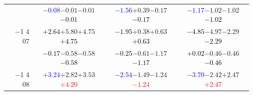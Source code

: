 \documentclass[compress]{beamer}
\begin{document}
\begin{frame}
\begin{tabular}{r | c | c | c}
          & \textcolor{blue}{$-0.08$}\hspace{0.1 cm}$-0.01$\hspace{0.1 cm}$-0.01$\hspace{0.1 cm}\textcolor{black}{$-0.01$} & \textcolor{blue}{$-1.56$}\hspace{0.1 cm}$+0.39$\hspace{0.1 cm}$-0.17$\hspace{0.1 cm}\textcolor{black}{$-0.17$} & \textcolor{blue}{$-1.17$}\hspace{0.1 cm}$-1.02$\hspace{0.1 cm}$-1.02$\hspace{0.1 cm}\textcolor{black}{$-1.02$} \\
$-$1 4 07 & \textcolor{black}{$+2.64$}\hspace{0.1 cm}$+5.80$\hspace{0.1 cm}$+4.75$\hspace{0.1 cm}\textcolor{black}{$+4.75$} & \textcolor{black}{$-1.95$}\hspace{0.1 cm}$+0.38$\hspace{0.1 cm}$+0.63$\hspace{0.1 cm}\textcolor{black}{$+0.63$} & \textcolor{black}{$-4.85$}\hspace{0.1 cm}$-4.97$\hspace{0.1 cm}$-2.29$\hspace{0.1 cm}\textcolor{black}{$-2.29$} \\
          & \textcolor{black}{$-0.17$}\hspace{0.1 cm}$-0.58$\hspace{0.1 cm}$-0.58$\hspace{0.1 cm}\textcolor{black}{$-0.58$} & \textcolor{black}{$-0.25$}\hspace{0.1 cm}$-0.61$\hspace{0.1 cm}$-1.17$\hspace{0.1 cm}\textcolor{black}{$-1.17$} & \textcolor{black}{$+0.02$}\hspace{0.1 cm}$-0.46$\hspace{0.1 cm}$-0.46$\hspace{0.1 cm}\textcolor{black}{$-0.46$} \\
$-$1 4 08 & \textcolor{blue}{$+3.24$}\hspace{0.1 cm}$+2.82$\hspace{0.1 cm}$+3.53$\hspace{0.1 cm}\textcolor{red}{$+4.20$} & \textcolor{blue}{$-2.54$}\hspace{0.1 cm}$-1.49$\hspace{0.1 cm}$-1.24$\hspace{0.1 cm}\textcolor{red}{$-1.24$} & \textcolor{blue}{$-3.70$}\hspace{0.1 cm}$-2.42$\hspace{0.1 cm}$+2.47$\hspace{0.1 cm}\textcolor{red}{$+2.47$} \\

\end{tabular}
\end{frame}
\end{document}
